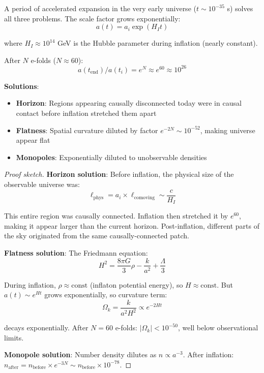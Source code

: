\begin{theorem}\label{thm:inflation}
A period of accelerated expansion in the very early universe ($t \sim 10^{-35}$ s) solves all three problems. The scale factor grows exponentially:
\begin{equation}
a(t) = a_i \exp(H_I t)
\end{equation}

where $H_I \approx 10^{14}$ GeV is the Hubble parameter during inflation (nearly constant).

After $N$ e-folds ($N \approx 60$):
\begin{equation}
a(t_{\text{end}}) / a(t_i) = e^N \approx e^{60} \approx 10^{26}
\end{equation}

\textbf{Solutions}:
\begin{itemize}
\item \textbf{Horizon}: Regions appearing causally disconnected today were in causal contact before inflation stretched them apart
\item \textbf{Flatness}: Spatial curvature diluted by factor $e^{-2N} \sim 10^{-52}$, making universe appear flat
\item \textbf{Monopoles}: Exponentially diluted to unobservable densities
\end{itemize}
\end{theorem}

\begin{proof}[Proof sketch]
\textbf{Horizon solution}: Before inflation, the physical size of the observable universe was:
\begin{equation}
\ell_{\text{phys}} = a_i \times \ell_{\text{comoving}} \sim \frac{c}{H_I}
\end{equation}

This entire region was causally connected. Inflation then stretched it by $e^{60}$, making it appear larger than the current horizon. Post-inflation, different parts of the sky originated from the same causally-connected patch.

\textbf{Flatness solution}: The Friedmann equation:
\begin{equation}
H^2 = \frac{8\pi G}{3} \rho - \frac{k}{a^2} + \frac{\Lambda}{3}
\end{equation}

During inflation, $\rho \approx \text{const}$ (inflaton potential energy), so $H \approx \text{const}$. But $a(t) \sim e^{Ht}$ grows exponentially, so curvature term:
\begin{equation}
\Omega_k = \frac{k}{a^2 H^2} \propto e^{-2Ht}
\end{equation}

decays exponentially. After $N = 60$ e-folds: $|\Omega_k| < 10^{-50}$, well below observational limits.

\textbf{Monopole solution}: Number density dilutes as $n \propto a^{-3}$. After inflation: $n_{\text{after}} = n_{\text{before}} \times e^{-3N} \sim n_{\text{before}} \times 10^{-78}$.
\end{proof}

